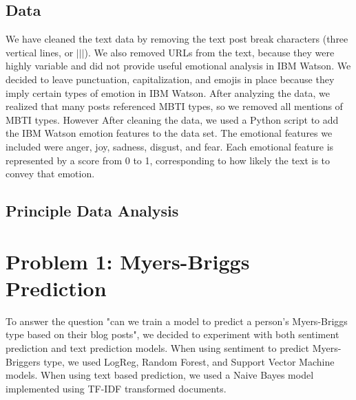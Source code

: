 \documentclass{article}
\begin{document}
\subsection{Data}
We have cleaned the text data by removing the text post break characters (three vertical lines, or $|||$). We also removed URLs from the text, because they were highly variable and did not provide useful emotional analysis in IBM Watson. We decided to leave punctuation, capitalization, and emojis in place because they imply certain types of emotion in IBM Watson. After analyzing the data, we realized that many posts referenced MBTI types, so we removed all mentions of MBTI types. However After cleaning the data, we used a Python script to add the IBM Watson emotion features to the data set. The emotional features we included were anger, joy, sadness, disgust, and fear. Each emotional feature is represented by a score from 0 to 1, corresponding to how likely the text is to convey that emotion. 

\subsection{Principle Data Analysis}

\section{Problem 1: Myers-Briggs Prediction}
To answer the question "can we train a model to predict a person's Myers-Briggs type based on their blog posts", we decided to experiment with both sentiment prediction and text prediction models. When using sentiment to predict Myers-Briggers type, we used LogReg, Random Forest, and Support Vector Machine models. When using text based prediction, we used a Naive Bayes model implemented using TF-IDF transformed documents. 
\end{document}
